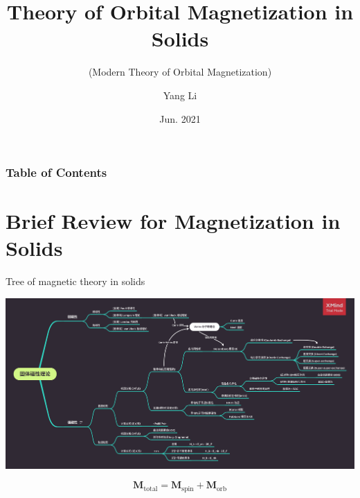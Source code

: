 \documentclass{beamer}
\title[Orbital Magnetization in Solids]{Theory of Orbital Magnetization in Solids}
\subtitle{(Modern Theory of Orbital Magnetization)}
\author[Yang Li]{
  Yang Li\inst{1}}
\institute[CMT Tsinghua Univ.]{
  \inst{1} Department of Physics\\
           Tsinghua University 
}
\date[Jun. 2021]{Jun. 2021}
\begin{document}
  \frame{\titlepage}

  \begin{frame}
    \frametitle{Table of Contents}
    \tableofcontents
  \end{frame}

  \section{Brief Review for Magnetization in Solids}
    \begin{frame}{Tree of magnetic theory in solids}
      \begin{tcolorbox}[beamer,width=\textwidth,arc=0pt,boxsep=0pt,left=0pt,right=0pt,top=0pt,bottom=0pt]
      \includegraphics[width=\textwidth]{figure/magnet-tree.png}
      \end{tcolorbox}
      \begin{equation*}
        \bm{M}_{\text{total}} = \bm{M}_{\text{spin}} + \bm{M}_{\text{orb}}
      \end{equation*}
    \end{frame}
\end{document}
